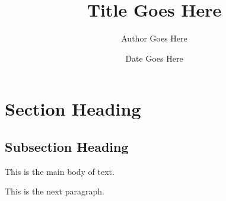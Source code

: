 \documentclass{article}
\title{Title Goes Here}
\author{Author Goes Here}
\date{Date Goes Here}
\begin{document}
\maketitle

\tableofcontents

\pagebreak

\section{Section Heading}
\subsection{Subsection Heading}

This is the main body of text. 

This is the next paragraph. 
\end{document}
